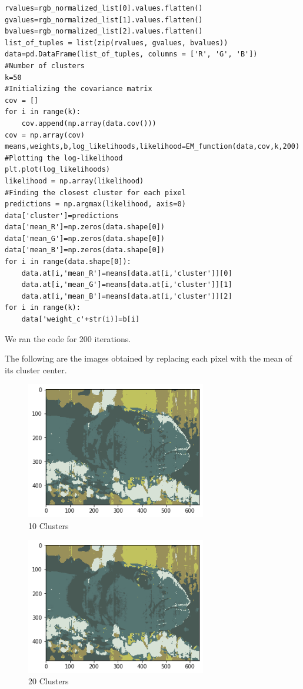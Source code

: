 \documentclass{article}      %
\begin{document}
\begin{lstlisting}
rvalues=rgb_normalized_list[0].values.flatten()
gvalues=rgb_normalized_list[1].values.flatten()
bvalues=rgb_normalized_list[2].values.flatten()
list_of_tuples = list(zip(rvalues, gvalues, bvalues))  
data=pd.DataFrame(list_of_tuples, columns = ['R', 'G', 'B'])
#Number of clusters
k=50
#Initializing the covariance matrix
cov = []
for i in range(k):
    cov.append(np.array(data.cov()))
cov = np.array(cov)
means,weights,b,log_likelihoods,likelihood=EM_function(data,cov,k,200)
#Plotting the log-likelihood
plt.plot(log_likelihoods)
likelihood = np.array(likelihood)
#Finding the closest cluster for each pixel
predictions = np.argmax(likelihood, axis=0)
data['cluster']=predictions
data['mean_R']=np.zeros(data.shape[0])
data['mean_G']=np.zeros(data.shape[0])
data['mean_B']=np.zeros(data.shape[0])
for i in range(data.shape[0]):
    data.at[i,'mean_R']=means[data.at[i,'cluster']][0]
    data.at[i,'mean_G']=means[data.at[i,'cluster']][1]
    data.at[i,'mean_B']=means[data.at[i,'cluster']][2]
for i in range(k):
    data['weight_c'+str(i)]=b[i]
\end{lstlisting}

 We ran the code for 200 iterations. 


The following are the images obtained by replacing each pixel with the mean of its cluster center. 

\begin{figure}[H]
\centering
\includegraphics[width=0.7\textwidth]{fish_partd_means_10}
\caption{10 Clusters}
\end{figure}

   
\begin{figure}[H]
\centering
\includegraphics[width=0.7\textwidth]{fish_partd_means_20}
\caption{20 Clusters}
\end{figure}
\end{document}
